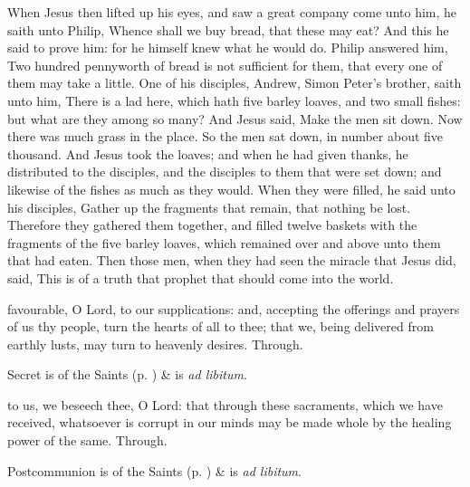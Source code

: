 
 When Jesus then lifted up his eyes, and saw a great company come unto him, he saith unto Philip, Whence shall we buy bread, that these may eat? And this he said to prove him: for he himself knew what he would do. Philip answered him, Two hundred pennyworth of bread is not sufficient for them, that every one of them may take a little. One of his disciples, Andrew, Simon Peter's brother, saith unto him, There is a lad here, which hath five barley loaves, and two small fishes: but what are they among so many? And Jesus said, Make the men sit down. Now there was much grass in the place. So the men sat down, in number about five thousand. And Jesus took the loaves; and when he had given thanks, he distributed to the disciples, and the disciples to them that were set down; and likewise of the fishes as much as they would. When they were filled, he said unto his disciples, Gather up the fragments that remain, that nothing be lost. Therefore they gathered them together, and filled twelve baskets with the fragments of the five barley loaves, which remained over and above unto them that had eaten. Then those men, when they had seen the miracle that Jesus did, said, This is of a truth that prophet that should come into the world.


\secret
{} favourable, O Lord, to our supplications: and, accepting the offerings and prayers of us thy people, turn the hearts of all to thee; that we, being delivered from earthly lusts, may turn to heavenly desires. Through.

\begin{rubric}
     Secret is of the Saints (p. \pageref{SPSaints}) \&  is \emph{ad libitum}.
\end{rubric}



 to us, we beseech thee, O Lord: that through these sacraments, which we have received, whatsoever is corrupt in our minds may be made whole by the healing power of the same. Through.

\begin{rubric}
     Postcommunion is of the Saints (p. \pageref{SPSaints}) \&  is \emph{ad libitum}.
\end{rubric}